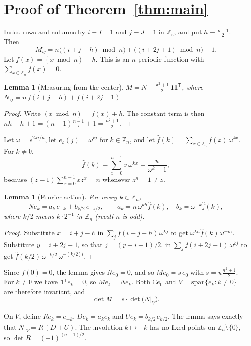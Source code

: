 \documentclass[11pt]{amsart}
\newtheorem{lemma}[theorem]{Lemma}
\theoremstyle{remark}
\newcommand{\Z}{\mathbb{Z}}
\begin{document}
\section{Proof of Theorem~\ref{thm:main}}

Index rows and columns by $i=I-1$ and $j=J-1$ in $\Z_n$, and put $h=\frac{n-1}{2}$. Then
\[
M_{ij} = n\bigl((i+j-h)\bmod n\bigr) + \bigl((i+2j+1)\bmod n\bigr) + 1 .
\]
Let $f(x)=(x\bmod n)-h$. This is an $n$-periodic function with $\sum_{x\in\Z_n}f(x)=0$.

\begin{lemma}[Measuring from the center]
$M = N + \frac{n^2+1}{2}\,\mathbf{1}\mathbf{1}^{\mathsf T}$, where $N_{ij}=n\,f(i+j-h)+f(i+2j+1)$.
\end{lemma}

\begin{proof}
Write $(x\bmod n)=f(x)+h$. The constant term is then $nh+h+1=(n+1)\frac{n-1}{2}+1=\frac{n^2+1}{2}$.
\end{proof}

Let $\omega=e^{2\pi i/n}$, let $e_k(j)=\omega^{kj}$ for $k\in\Z_n$, and let
$\hat f(k)=\sum_{x\in\Z_n}f(x)\,\omega^{kx}$. For $k\neq0$,
\begin{equation}\label{eq:saw}
\hat f(k)=\sum_{x=0}^{n-1}x\,\omega^{kx}=\frac{n}{\omega^k-1},
\end{equation}
because $(z-1)\sum_{x=0}^{n-1}xz^x=n$ whenever $z^n=1\neq z$.

\begin{lemma}[Fourier action]
For every $k\in\Z_n$,
\[
N e_k = a_k\, e_{-k} + b_{k/2}\, e_{-k/2},\qquad a_k=n\,\omega^{kh}\hat f(k),\quad b_k=\omega^{-k}\hat f(k),
\]
where $k/2$ means $k\cdot 2^{-1}$ in $\Z_n$ (recall $n$ is odd).
\end{lemma}

\begin{proof}
Substitute $x=i+j-h$ in $\sum_j f(i+j-h)\,\omega^{kj}$ to get $\omega^{kh}\hat f(k)\,\omega^{-ki}$. Substitute
$y=i+2j+1$, so that $j=(y-i-1)/2$, in $\sum_j f(i+2j+1)\,\omega^{kj}$ to get $\hat f(k/2)\,\omega^{-k/2}\,\omega^{-(k/2)i}$.
\end{proof}

Since $\hat f(0)=0$, the lemma gives $N e_0=0$, and so $M e_0=s\,e_0$ with $s=n\frac{n^2+1}{2}$. For $k\neq0$ we have
$\mathbf{1}^{\mathsf T}e_k=0$, so $M e_k=N e_k$. Both $\mathbb{C}e_0$ and $V=\mathrm{span}\{e_k:k\neq0\}$ are therefore
invariant, and
\[
\det M = s\cdot \det\bigl(N|_V\bigr).
\]

On $V$, define $R e_k=e_{-k}$, $D e_k=a_k e_k$ and $U e_k=b_{k/2}\,e_{k/2}$. The lemma says exactly that
$N|_V=R\,(D+U)$. The involution $k\mapsto -k$ has no fixed points on $\Z_n\setminus\{0\}$, so
$\det R=(-1)^{(n-1)/2}$.
\end{document}
